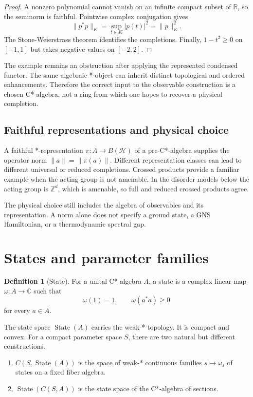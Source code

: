 \documentclass[12pt]{article}
\theoremstyle{definition}
\newtheorem{definition}[theorem]{Definition}
\theoremstyle{remark}
\newcommand{\C}{\mathbb C}
\newcommand{\R}{\mathbb R}
\newcommand{\Z}{\mathbb Z}
\newcommand{\State}{\operatorname{State}}
\begin{document}
\begin{proof}
A nonzero polynomial cannot vanish on an infinite compact subset of $\R$, so the
seminorm is faithful.  Pointwise complex conjugation gives
\[
\|p^*p\|_K=\sup_{t\in K}|p(t)|^2=\|p\|_K^2.
\]
The Stone-Weierstrass theorem identifies the completions.  Finally,
$1-t^2\geq0$ on $[-1,1]$ but takes negative values on $[-2,2]$.
\end{proof}

The example remains an obstruction after applying the represented condensed functor.
The same algebraic *-object can inherit distinct topological and ordered
enhancements.  Therefore the correct input to the observable construction is a
chosen C*-algebra, not a ring from which one hopes to recover a physical completion.

\subsection{Faithful representations and physical choice}

A faithful *-representation $\pi:A\to B(\mathcal H)$ of a pre-C*-algebra supplies
the operator norm $\|a\|=\|\pi(a)\|$.  Different representation classes can lead to
different universal or reduced completions.  Crossed products provide a familiar
example when the acting group is not amenable.  In the disorder models below the
acting group is $\Z^d$, which is amenable, so full and reduced crossed products agree.

The physical choice still includes the algebra of observables and its representation.
A norm alone does not specify a ground state, a GNS Hamiltonian, or a thermodynamic
spectral gap.

\section{States and parameter families}

\begin{definition}[State]
For a unital C*-algebra $A$, a state is a complex linear map
$\omega:A\to\C$ such that
\[
\omega(1)=1,
\qquad
\omega(a^*a)\geq0
\]
for every $a\in A$.
\end{definition}

The state space $\State(A)$ carries the weak-* topology.  It is compact and convex.
For a compact parameter space $S$, there are two natural but different constructions.

\begin{enumerate}[leftmargin=2em]
\item $C(S,\State(A))$ is the space of weak-* continuous families
  $s\mapsto\omega_s$ of states on a fixed fiber algebra.
\item $\State(C(S,A))$ is the state space of the C*-algebra of sections.
\end{enumerate}
\end{document}
